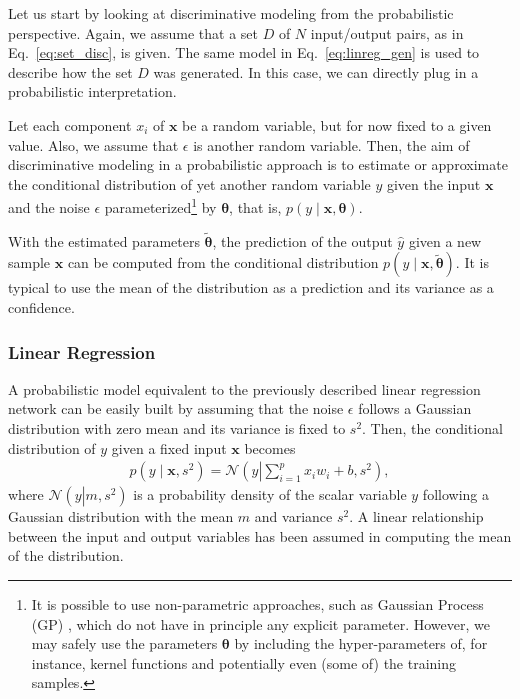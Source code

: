 \documentclass[dissertation,nocontribution,draft*]{aaltoseries}
\newcommand{\vect}[1]{\mathbf{#1}}
\newcommand{\vects}[1]{\boldsymbol{#1}}
\newcommand{\vx}[0]{\vect{x}}
\newcommand{\TT}[0]{{\vects{\theta}}}
\newcommand{\NN}[0]{\mathcal{N}}
\begin{document}
Let us start by looking at discriminative modeling from
the probabilistic perspective. Again, we assume that a set
$D$ of $N$ input/output pairs, as in
Eq.~\eqref{eq:set_disc}, is given. The same model in
Eq.~\eqref{eq:linreg_gen} is used to describe how the set
$D$ was generated. In this case, we can directly plug in a
probabilistic interpretation.

Let each component $x_i$ of $\vx$ be a random variable, but
for now fixed to a given value. Also, we assume that
$\epsilon$ is another random variable. Then, the aim of
discriminative modeling in a probabilistic approach is to
estimate or approximate the conditional distribution of
yet another random variable $y$ given the input $\vx$ and
the noise $\epsilon$ parameterized\footnote{It is
possible to use non-parametric approaches, such as Gaussian
Process (GP) \citep[see, e.g.,][]{Rasmussen2006}, which do
not have in principle any explicit parameter. However, we may safely
use the parameters $\TT$ by including the hyper-parameters
of, for instance, kernel functions and potentially even
(some of) the training samples.} by $\TT$, that is, ${p(y \mid \vx,
\TT)}$.

With the estimated parameters $\tilde{\TT}$, the prediction
of the output $\hat{y}$ given a new sample $\vx$ can be
computed from the conditional distribution $p(y \mid
\vx, \tilde{\TT})$. It is typical to use the mean of the
distribution as a prediction and its variance as a
confidence.

\subsubsection{Linear Regression}

A probabilistic model equivalent to the previously described
linear regression network can be easily built by assuming
that the noise
$\epsilon$ follows a Gaussian distribution with zero mean
and its variance is fixed to $s^2$. Then, the conditional
distribution of $y$ given a fixed input $\vx$ becomes
\begin{align*}
    p(y \mid \vx, s^2) = \NN \left( y \left| \sum_{i=1}^p
    x_i w_i + b, s^2\right.\right),
\end{align*}
where $\NN \left( y \left| m, s^2\right.\right)$ is a
probability density of the scalar variable $y$ following a Gaussian distribution
with the mean $m$ and variance $s^2$. A linear relationship
between the input and output variables has been assumed in
computing the mean of the distribution.
\end{document}
